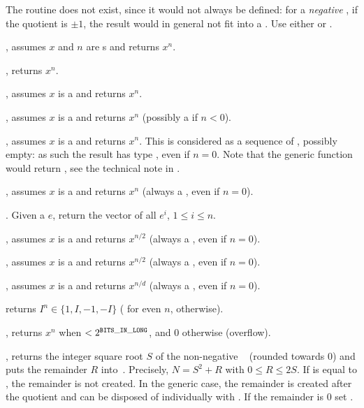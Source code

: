 The routine  does not exist, since it would not always be
defined: for a \emph{negative} , if the quotient is $\pm1$, the result
 would in general not fit into a . Use either
 or .


, assumes $x$ and $n$ are s and
returns $x^n$.

, returns $x^n$.

, assumes $x$ is a  and returns $x^n$.

, assumes $x$ is a  and returns $x^n$
(possibly a  if $n < 0$).

, assumes $x$ is a  and returns
$x^n$. This is considered as a sequence of , possibly empty:
as such the result has type , even if $n = 0$.
Note that the generic function  would return ,
see the technical note in .

, assumes $x$ is a  and returns $x^n$
(always a , even if $n = 0$).

. Given a  $e$, return the vector
of all $e^i$, $1 \leq i \leq n$.

, assumes $x$ is a  and returns
$x^{n/2}$ (always a , even if $n = 0$).

, assumes $x$ is a  and returns
$x^{n/2}$ (always a , even if $n = 0$).

, assumes $x$ is a  and
returns $x^{n/d}$ (always a , even if $n = 0$).

 returns $I^n\in\{1,I,-1,-I\}$ ( for even $n$,
 otherwise).

, returns $x^n$ when $< 2^{\tt BITS\_IN\_LONG}$, and $0$
otherwise (overflow).

, returns the integer square root $S$ of
the non-negative ~ (rounded towards 0) and puts the remainder
$R$ into~. Precisely, $N = S^2 + R$ with $0\leq R \leq 2S$. If
 is equal to , the remainder is not created. In the generic
case, the remainder is created after the quotient and can be disposed of
individually with . If the remainder is $0$ set .

